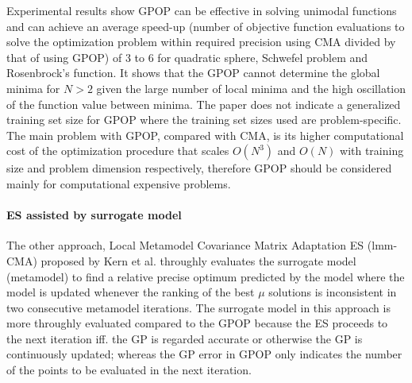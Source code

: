 Experimental results show GPOP can be effective in solving unimodal functions and can achieve an average speed-up (number of objective function evaluations to solve the optimization problem within required precision using CMA divided by that of using GPOP) of 3 to 6 for quadratic sphere, Schwefel problem and Rosenbrock's function. It shows that the GPOP cannot determine the global minima for $N>2$ given the large number of local minima and the high oscillation of the function value between minima. The paper does not indicate a generalized training set size for GPOP where the training set sizes used are problem-specific. 
The main problem with GPOP, compared with CMA, is its higher computational cost of the optimization procedure that scales $O(N^3)$ and $O(N)$ with training size and problem dimension respectively, therefore GPOP should be considered mainly for computational expensive problems.


\paragraph{ES assisted by surrogate model}
The other approach, Local Metamodel Covariance Matrix Adaptation ES (lmm-CMA) proposed by Kern et al. \cite{10.1007/11844297_95} throughly evaluates the surrogate model (metamodel) to find a relative precise optimum predicted by the model where the model is updated whenever the ranking of the best $\mu$ solutions is inconsistent in two consecutive metamodel iterations. The surrogate model in this approach is more throughly evaluated compared to the GPOP because the ES proceeds to the next iteration iff. the GP is regarded accurate or otherwise the GP is continuously updated; whereas the GP error in GPOP only indicates the number of the points to be evaluated in the next iteration.       


